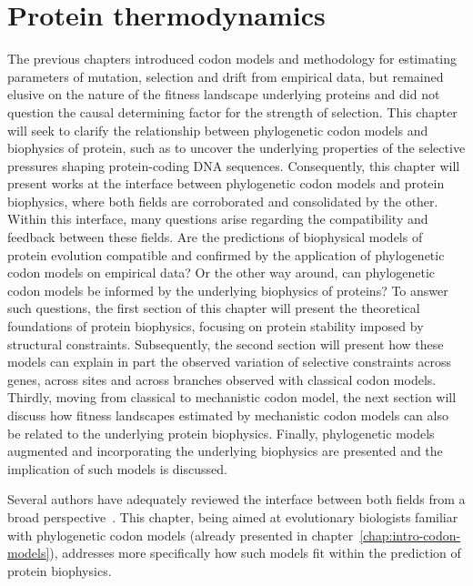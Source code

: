 \chapter{Protein thermodynamics}
{\hypersetup{linkcolor=GREYDARK}\minitoc}
\label{chap:intro-physic-proteins}

The previous chapters introduced \gls{codon} models and methodology for estimating parameters of mutation, selection and drift from empirical data, but remained elusive on the nature of the fitness landscape underlying proteins and did not question the causal determining factor for the strength of selection.
This chapter will seek to clarify the relationship between phylogenetic \gls{codon} models and biophysics of protein, such as to uncover the underlying properties of the selective pressures shaping protein-coding \acrshort{DNA} sequences.
Consequently, this chapter will present works at the interface between phylogenetic \gls{codon} models and protein biophysics, where both fields are corroborated and consolidated by the other.
Within this interface, many questions arise regarding the compatibility and feedback between these fields.
Are the predictions of biophysical models of protein evolution compatible and confirmed by the application of phylogenetic \gls{codon} models on empirical data?
Or the other way around, can phylogenetic \gls{codon} models be informed by the underlying biophysics of proteins?
To answer such questions, the first section of this chapter will present the theoretical foundations of protein biophysics, focusing on protein stability imposed by structural constraints.
Subsequently, the second section will present how these models can explain in part the observed variation of selective constraints across genes, across sites and across branches observed with classical \gls{codon} models.
Thirdly, moving from classical to mechanistic \gls{codon} model, the next section will discuss how fitness landscapes estimated by mechanistic \gls{codon} models can also be related to the underlying protein biophysics.
Finally, phylogenetic models augmented and incorporating the underlying biophysics are presented and the implication of such models is discussed.

Several authors have adequately reviewed the interface between both fields from a broad perspective~\citep{Liberles2012,Serohijos2014,Sikosek2014,Arenas2015,Echave2017,Bastolla2017}. This chapter, being aimed at evolutionary biologists familiar with phylogenetic \gls{codon} models (already presented in chapter~\ref{chap:intro-codon-models}), addresses more specifically how such models fit within the prediction of protein biophysics.

